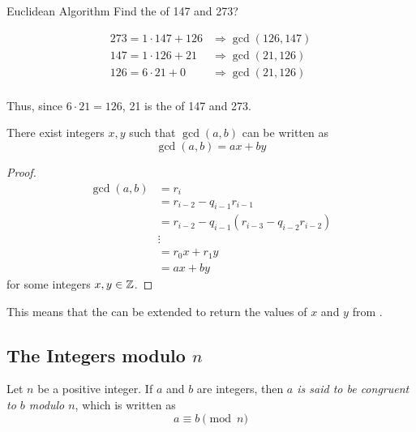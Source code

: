 \begin{example}{Euclidean Algorithm}
  Find the  of 147 and 273?

  \tcblower{}

  \begin{align*}
    273 = 1 \cdot 147 + 126 &\Rightarrow \gcd(126, 147) \\
    147 = 1 \cdot 126 + 21 &\Rightarrow \gcd(21, 126) \\
    126 = 6 \cdot 21 + 0 &\Rightarrow \gcd(21, 126) \\
  \end{align*}

  Thus, since $6 \cdot 21 = 126$, 21 is the  of 147 and 273.
\end{example}

\begin{theorem}
  There exist integers $x, y$ such that $\gcd(a, b)$ can be written as
  \begin{equation}\label{eq:Extended_Euclidean_Algorithm_Basis}
    \gcd(a, b) = ax + by
  \end{equation}
\end{theorem}
\begin{proof}
  \begin{align*}
    \gcd(a, b) &= r_{i} \\
               &= r_{i-2} - q_{i-1}r_{i-1} \\
               &= r_{i-2} - q_{i-1}(r_{i-3} - q_{i-2}r_{i-2}) \\
               &\vdots \\
               &= r_{0}x + r_{1}y \\
               &= ax + by
  \end{align*}
  for some integers $x, y \in \operatorname{\mathbb{Z}}$.
\end{proof}

This means that the  can be extended to return the values of $x$ and $y$ from .

\subsection{The Integers modulo $n$}\label{subsec:Integer_Modulo_n}
Let $n$ be a positive integer.
If $a$ and $b$ are integers, then \emph{$a$ is said to be congruent to $b$ modulo $n$}, which is written as
\begin{equation}\label{eq:A_Congruent_B}
  a \equiv b \pmod{n}
\end{equation}

